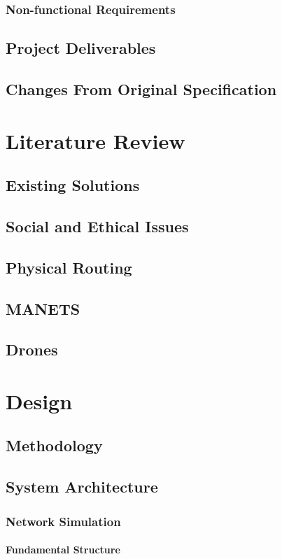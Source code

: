 \documentclass[12pt,a4paper,twoside]{report}
\begin{document}
		\subsection{Non-functional Requirements}
	\section{Project Deliverables}
	\section{Changes From Original Specification}

\chapter{Literature Review}
	\section{Existing Solutions}
	\section{Social and Ethical Issues}
	\section{Physical Routing}
	\section{MANETS}
	\section{Drones}	

\chapter{Design}
	\section{Methodology}
	\section{System Architecture}
		\subsection{Network Simulation}
			\subsubsection{Fundamental Structure}
\end{document}
